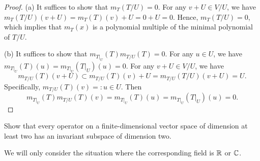 \documentclass{article}
\begin{document}
\begin{proof}
  (a) It suffices to show that \( m_T(T/U)=0 \). For any \( v+U\in V/U \), we have \( m_T(T/U)(v+U)=m_T(T)(v)+U=0+U=0 \). Hence, \( m_T(T/U)=0 \), which implies that \( m_T(x) \) is a polynomial multiple of the minimal polynomial of \( T/U \).\par
  (b) It suffices to show that \( m_{T|_U}(T)m_{T/U}(T)=0 \). For any \( u\in U \), we have \( m_{T|_U}(T)(u)=m_{T|_U}(T|_U)(u)=0 \). For any \( v+U\in V/U \), we have
  \[
    m_{T/U}(T)(v+U)
    \subset m_{T/U}(T)(v)+U
    =m_{T/U}(T/U)(v+U)
    =U.
  \]
  Specifically, \( m_{T/U}(T)(v)=:u\in U \). Then
  \[ m_{T|_U}(T)m_{T/U}(T)(v)=m_{T|_U}(T)(u)=m_{T|_U}(T|_U)(u)=0. \]
\end{proof}



\begin{problem}[5B-29]
Show that every operator on a finite-dimensional vector space of dimension at least two has an invariant subspace of dimension two.
\end{problem}

\begin{note}
  We will only consider the situation where the corresponding field is \( \mathbb{R} \) or \( \mathbb{C} \). 
\end{note}
\end{document}
